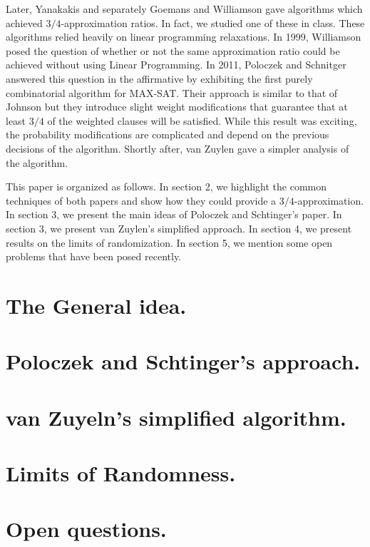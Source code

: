 \documentclass[11pt,letter]{article}
\begin{document}
Later, Yanakakis \cite{Yannakakis1994475} and separately Goemans and Williamson \cite{Goemans94new3/4-approximation} gave algorithms which achieved $3/4$-approximation ratios. In fact, we studied one of these in class. These algorithms relied heavily on linear programming relaxations. In 1999, Williamson posed the question of whether or not the same approximation ratio could be achieved without using Linear Programming. In 2011, Poloczek and Schnitger \cite{Poloczek:2011:RVJ:2133036.2133087} answered this question in the affirmative by exhibiting the first purely combinatorial algorithm for MAX-SAT. Their approach is similar to that of Johnson but they introduce slight weight modifications that guarantee that at least $3/4$ of the weighted clauses will be satisfied. While this result was exciting, the probability modifications are complicated and depend on the previous decisions of the algorithm. Shortly after, van Zuylen \cite{vanZuylen:2011:SAM:2238496.2238512} gave a simpler analysis of the algorithm. 

This paper is organized as follows. In section 2, we highlight the common techniques of both papers and show how they could provide a $3/4$-approximation. In section 3, we present the main ideas of Poloczek and Schtinger's paper. In section 3, we present van Zuylen's simplified approach. In section 4, we present results on the limits of randomization. In section 5, we mention some open problems that have been posed recently.

\section{The General idea.} 

\section{Poloczek and Schtinger's approach.}
\section{van Zuyeln's simplified algorithm.}
\section{Limits of Randomness.}
\section{Open questions.}
 
 

\end{document}
